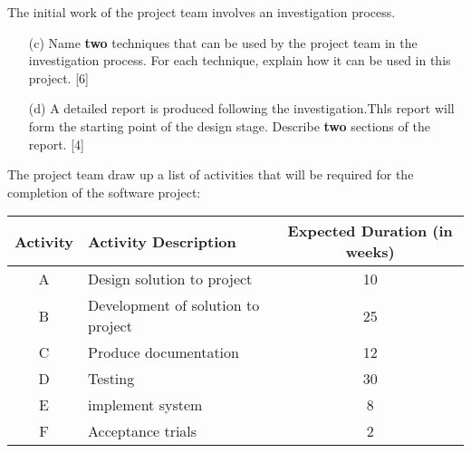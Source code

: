 The initial work of the project team involves an investigation process. 
\begin{enumerate}
\item[(c)] Name \textbf{two }techniques that can be used by the project team
in the investigation process. For each technique, explain how it can
be used in this project.\hfill{} {[}6{]}
\item[(d)] A detailed report is produced following the investigation.Thls report
will form the starting point of the design stage. Describe \textbf{two}
sections of the report.\hfill{} {[}4{]}
\end{enumerate}
The project team draw up a list of activities that will be required
for the completion of the software project:
\begin{center}
\begin{tabular}{|c|l|c|}
\hline 
Activity & \texttt{\hspace{0.01\columnwidth}}Activity Description  & Expected Duration (in weeks)\tabularnewline
\hline 
A & Design solution to project & 10\tabularnewline
\hline 
B & Development of solution to project & 25\tabularnewline
\hline 
C & Produce documentation & 12\tabularnewline
\hline 
D & Testing & 30\tabularnewline
\hline 
E & implement system & 8\tabularnewline
\hline 
F & Acceptance trials & 2\tabularnewline
\hline 
\end{tabular}
\par\end{center}

